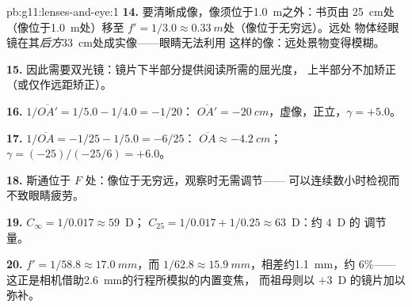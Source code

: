 \begin{solution}{pb:g11:lenses-and-eye:1}
\textbf{14.} 要清晰成像，像须位于\qty{1.0}{m}之外：书页由
\qty{25}{cm}处（像位于\qty{1.0}{m}处）移至
$f' = 1/3.0 \approx \qty{0.33}{m}$处（像位于无穷远）。远处
物体经眼镜在其\emph{后方}\qty{33}{cm}处成实像——眼睛无法利用
这样的像：远处景物变得模糊。

\textbf{15.} 因此需要双光镜：镜片下半部分提供阅读所需的屈光度，
上半部分不加矫正（或仅作远距矫正）。

\textbf{16.} $1/\overline{OA'} = 1/5.0 - 1/4.0 = -1/20$：
$\overline{OA'} = \qty{-20}{cm}$，虚像，正立，$\gamma = +5.0$。

\textbf{17.} $1/\overline{OA} = -1/25 - 1/5.0 = -6/25$：
$\overline{OA} \approx \qty{-4.2}{cm}$；$\gamma = (-25)/(-25/6) = +6.0$。

\textbf{18.} 斯通位于 $F$ 处：像位于无穷远，观察时无需调节——
可以连续数小时检视而不致眼睛疲劳。

\textbf{19.} $C_\infty = 1/0.017 \approx 59$~D；
$C_{25} = 1/0.017 + 1/0.25 \approx 63$~D：约 $4$~D 的
调节量。

\textbf{20.} $f' = 1/58.8 \approx \qty{17.0}{mm}$，而
$1/62.8 \approx \qty{15.9}{mm}$，相差约\qty{1.1}{mm}，约 $6\%$——
这正是相机借助\qty{2.6}{mm}的行程所模拟的内置变焦，
而祖母则以 $+3$~D 的镜片加以弥补。
\end{solution}
